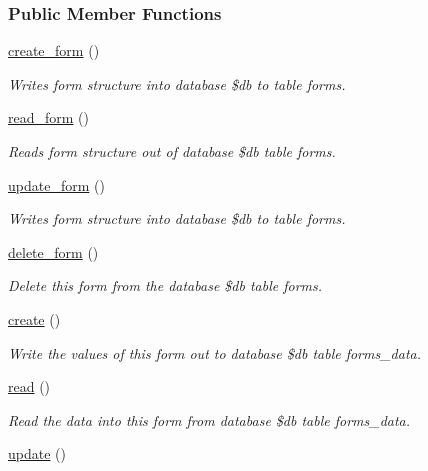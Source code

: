 \subsubsection*{Public Member Functions}
\begin{DoxyCompactItemize}
\item 
\hyperlink{classdatabase__form_a1d3ac5bd74951304e9be88700ac0dcda}{create\-\_\-form} ()
\begin{DoxyCompactList}\small\item\em Writes form structure into database \$db to table forms. \end{DoxyCompactList}\item 
\hyperlink{classdatabase__form_adb7962f1e12276e5d5d35d9bb43db0d6}{read\-\_\-form} ()
\begin{DoxyCompactList}\small\item\em Reads form structure out of database \$db table forms. \end{DoxyCompactList}\item 
\hyperlink{classdatabase__form_aae32575f2c15be7e82d574b01488292f}{update\-\_\-form} ()
\begin{DoxyCompactList}\small\item\em Writes form structure into database \$db to table forms. \end{DoxyCompactList}\item 
\hyperlink{classdatabase__form_a34c12094e361bdb922a5131a55826d28}{delete\-\_\-form} ()
\begin{DoxyCompactList}\small\item\em Delete this form from the database \$db table forms. \end{DoxyCompactList}\item 
\hyperlink{classdatabase__form_a2f217d182a55038d501b66f2a2d51abc}{create} ()
\begin{DoxyCompactList}\small\item\em Write the values of this form out to database \$db table forms\-\_\-data. \end{DoxyCompactList}\item 
\hyperlink{classdatabase__form_aff5e2b2b523b84443a34bc37472d5c8a}{read} ()
\begin{DoxyCompactList}\small\item\em Read the data into this form from database \$db table forms\-\_\-data. \end{DoxyCompactList}\item 
\hyperlink{classdatabase__form_a9c66a1a5dbd77ce0d110dd1672f74743}{update} ()

\end{DoxyCompactItemize}
